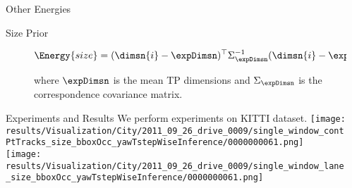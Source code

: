 \documentclass[final]{beamer}
\newlength{\sepwid}
\newlength{\onecolwid}
\begin{document}
\begin{frame}[t]
\begin{columns}[t]
\begin{column}{\onecolwid}
\begin{block}{Other Energies}
\begin{description}
          \item[Size Prior]
            \begin{align}
              \label{eq:totalSizeEnergy}
              \Energy{size} &= (\dimsn{i} - \expDimsn)^\top\Sigma_{\expDimsn}^{-1}(\dimsn{i} -
              \expDimsn)
            \end{align}

            where $\expDimsn$ is the mean TP dimensions and
            $\Sigma_{\expDimsn}$ is the correspondence covariance matrix.

        \end{description}
      \end{block}
      \begin{block}{Experiments and Results}
        We perform experiments on KITTI \cite{geiger2013vision} dataset.
        \texttt{[image: results/Visualization/City/2011\_09\_26\_drive\_0009/single\_window\_contPtTracks\_size\_bboxOcc\_yawTstepWiseInference/0000000061.png]}\\
        \texttt{[image: results/Visualization/City/2011\_09\_26\_drive\_0009/single\_window\_lane\_size\_bboxOcc\_yawTstepWiseInference/0000000061.png]}\\

        
      \end{block}
    \end{column}

  \begin{column}{\sepwid}\end{column}			%


\end{columns}
\end{frame}
\end{document}

